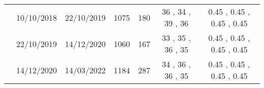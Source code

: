 \documentclass{article}
\begin{document}
\begin{table}[htbp]
{\begin{adjustwidth}{0in}{0in}
\begin{tabular}{ccccccc}
				& 10/10/2018                      & 22/10/2019                    & 1075                       & 180                       & 36                          , 34                          , 39                          , 36                          & 0.45                        , 0.45                        , 0.45                        , 0.45                        \\
				& 22/10/2019                      & 14/12/2020                    & 1060                       & 167                       & 33                          , 35                          , 36                          , 35                          & 0.45                        , 0.45                        , 0.45                        , 0.45                        \\
				& 14/12/2020                      & 14/03/2022                    & 1184                       & 287                       & 34                          , 36                          , 36                          , 35                          & 0.45                        , 0.45                        , 0.45                        , 0.45                        \\
				\bottomrule
			\end{tabular}
		\end{adjustwidth}
		\label{tab:table1}
	}	
\end{table}
\restoregeometry

\newpage
\end{document}
